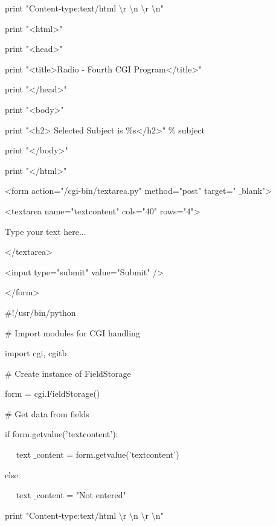 \begin {enumerate}
\begin {enumerate}
print "Content-type:text/html $  \setminus  $r $  \setminus  $n $  \setminus  $r $  \setminus  $n" \par
\noindent
print "<html>" \par
\noindent
print "<head>" \par
\noindent
print "<title>Radio - Fourth CGI Program</title>" \par
\noindent
print "</head>" \par
\noindent
print "<body>" \par
\noindent
print "<h2> Selected Subject is  $  \%  $s</h2>"  $  \%  $ subject \par
\noindent
print "</body>" \par
\noindent
print "</html>" \par
\vspace{12pt}
\noindent
<form action="/cgi-bin/textarea.py" method="post" target=" $  \_  $blank"> \par
\noindent
<textarea name="textcontent" cols="40" rows="4"> \par
\noindent
Type your text here... \par
\noindent
</textarea> \par
\noindent
<input type="submit" value="Submit" /> \par
\noindent
</form> \par
\vspace{12pt}
\noindent
 $  \#  $!/usr/bin/python \par
\vspace{12pt}
\noindent
 $  \#  $ Import modules for CGI handling  \par
\noindent
import cgi, cgitb  \par
\vspace{12pt}
\noindent
 $  \#  $ Create instance of FieldStorage  \par
\noindent
form = cgi.FieldStorage()  \par
\vspace{12pt}
\noindent
 $  \#  $ Get data from fields \par
\noindent
if form.getvalue('textcontent'): \par
\noindent
~~ text $  \_  $content = form.getvalue('textcontent') \par
\noindent
else: \par
\noindent
~~ text $  \_  $content = "Not entered" \par
\vspace{12pt}
\noindent
print "Content-type:text/html $  \setminus  $r $  \setminus  $n $  \setminus  $r $  \setminus  $n" \par

\end{enumerate}
\end{enumerate}
